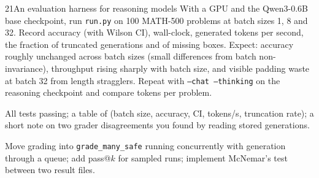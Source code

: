 \begin{labbox}{21}{An evaluation harness for reasoning models}
With a GPU and the Qwen3-0.6B base checkpoint, run \texttt{run.py} on 100 MATH-500 problems at
batch sizes 1, 8 and 32. Record accuracy (with Wilson CI), wall-clock, generated tokens per second,
the fraction of truncated generations and of missing boxes. Expect: accuracy roughly unchanged
across batch sizes (small differences from batch non-invariance), throughput rising sharply with
batch size, and visible padding waste at batch 32 from length stragglers. Repeat with
\texttt{--chat --thinking} on the reasoning checkpoint and compare tokens per problem.

All tests passing; a table of (batch size, accuracy, CI, tokens/s, truncation rate); a short note
on two grader disagreements you found by reading stored generations.

Move grading into \texttt{grade\_many\_safe} running concurrently with generation through a queue;
add pass@$k$ for sampled runs; implement McNemar's test between two result files.
\end{labbox}

